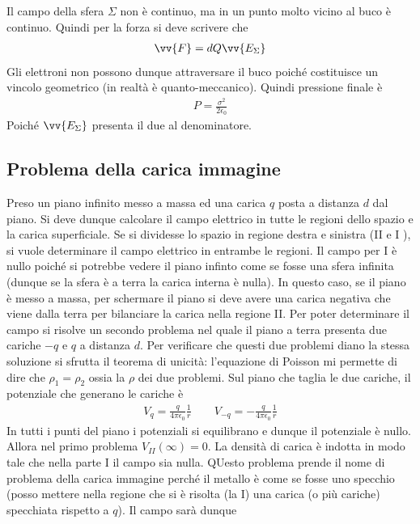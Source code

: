 \documentclass[a4paper, oneside]{article}
\begin{document}
    Il campo della sfera $\Sigma$ non è continuo, ma in un punto molto vicino al 
    buco è continuo. Quindi per la forza si deve scrivere che 
    \begin{gather*}
        \vv{F} = dQ\vv{E_\Sigma}  
    \end{gather*}
    Gli elettroni non possono dunque attraversare il buco poiché costituisce un vincolo
    geometrico (in realtà è quanto-meccanico). Quindi  pressione finale è 
    \begin{align}
        P = \frac{\sigma^{2}}{2\epsilon_0}
    \end{align}
    Poiché $\vv{E_\Sigma}$ presenta il due al denominatore. 

\subsection{Problema della carica immagine}
Preso un piano infinito messo a massa ed una carica $q$ posta a distanza $d$ dal piano.
Si deve dunque calcolare il campo elettrico in tutte le regioni dello spazio e la carica superficiale.
Se si dividesse lo spazio in regione destra e sinistra (II e I ), si vuole determinare 
il campo elettrico in entrambe le regioni. Il campo per I è nullo poiché si potrebbe vedere il piano infinto come 
    se fosse una sfera infinita (dunque se la sfera è a terra la carica interna è nulla).
    In questo caso, se il piano è messo a massa, per schermare il piano 
    si deve avere una carica negativa che viene dalla terra per bilanciare la carica nella regione II. 
    Per poter determinare il campo si risolve un secondo problema nel quale il piano a terra presenta due 
cariche $-q$ e $q$ a distanza $d$. Per verificare che questi due problemi diano la stessa 
soluzione si sfrutta il teorema di unicità: l'equazione di Poisson mi permette di dire che 
$\rho_1 = \rho_2$ ossia la $\rho$ dei due problemi. Sul piano che taglia le due cariche,
il potenziale che generano le cariche è
\begin{gather*}
    V_q = \frac{q}{4\pi\epsilon_0} \frac{1}{r}  \qquad V_{-q} = -\frac{q}{4\pi\epsilon_0} \frac{1}{r}
\end{gather*}
In tutti i punti del piano i potenziali si equilibrano e dunque il potenziale è nullo.
Allora nel primo problema $V_{II}(\infty ) = 0$. La densità di carica è indotta in modo tale che 
nella parte I il campo sia nulla. 
QUesto problema prende il nome di problema della carica 
immagine perché il metallo è come se fosse uno specchio (posso mettere nella regione 
che si è risolta (la I) una carica (o più cariche) specchiata rispetto a $q$). Il campo sarà dunque 
\end{document}
